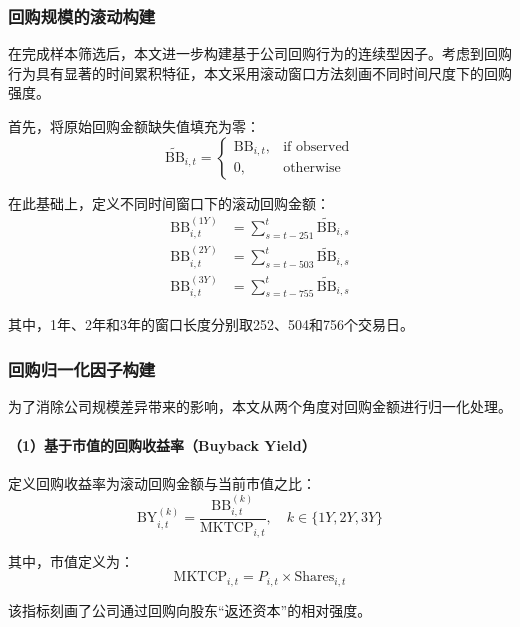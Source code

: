 \documentclass[a4paper,10pt]{article}
\begin{document}
\subsubsection{回购规模的滚动构建}

在完成样本筛选后，本文进一步构建基于公司回购行为的连续型因子。考虑到回购行为具有显著的时间累积特征，本文采用滚动窗口方法刻画不同时间尺度下的回购强度。

首先，将原始回购金额缺失值填充为零：
\begin{equation}
\widetilde{\text{BB}}_{i,t} = 
\begin{cases}
\text{BB}_{i,t}, & \text{if observed} \\
0, & \text{otherwise}
\end{cases}
\end{equation}

在此基础上，定义不同时间窗口下的滚动回购金额：
\begin{align}
\text{BB}^{(1Y)}_{i,t} &= \sum_{s=t-251}^{t} \widetilde{\text{BB}}_{i,s} \\
\text{BB}^{(2Y)}_{i,t} &= \sum_{s=t-503}^{t} \widetilde{\text{BB}}_{i,s} \\
\text{BB}^{(3Y)}_{i,t} &= \sum_{s=t-755}^{t} \widetilde{\text{BB}}_{i,s}
\end{align}

其中，1年、2年和3年的窗口长度分别取252、504和756个交易日。

\subsubsection{回购归一化因子构建}

为了消除公司规模差异带来的影响，本文从两个角度对回购金额进行归一化处理。

\paragraph{（1）基于市值的回购收益率（Buyback Yield）}

定义回购收益率为滚动回购金额与当前市值之比：
\begin{equation}
\text{BY}^{(k)}_{i,t} = \frac{\text{BB}^{(k)}_{i,t}}{\text{MKTCP}_{i,t}}, \quad k \in \{1Y, 2Y, 3Y\}
\end{equation}

其中，市值定义为：
\begin{equation}
\text{MKTCP}_{i,t} = P_{i,t} \times \text{Shares}_{i,t}
\end{equation}

该指标刻画了公司通过回购向股东“返还资本”的相对强度。
\end{document}
